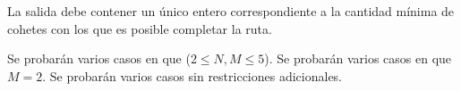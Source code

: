 \documentclass{oci}
\begin{document}
\begin{outputDescription}
  La salida debe contener un único entero correspondiente a la cantidad mínima
  de cohetes con los que es posible completar la ruta.
\end{outputDescription}

\begin{scoreDescription}
  Se probarán varios casos en que ($2 \leq N, M \leq 5$).
  Se probarán varios casos en que $M=2$.
  Se probarán varios casos sin restricciones adicionales.
\end{scoreDescription}

\begin{sampleDescription}
\end{sampleDescription}
\end{document}
